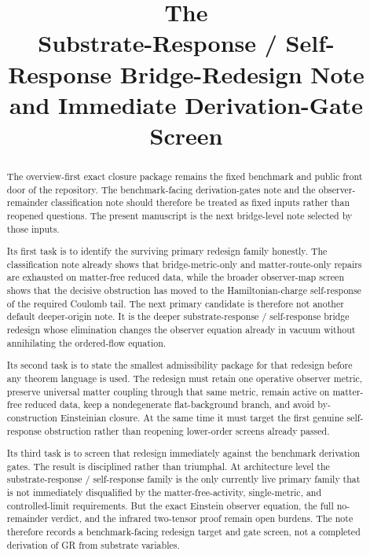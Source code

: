 \documentclass[11pt]{article}
\title{\textbf{The \TheoryName{}}\\[0.4em]
\large Substrate-Response / Self-Response Bridge-Redesign Note\\
\large and Immediate Derivation-Gate Screen}
\author{}
\date{}
\newcommand{\ExactClosure}{exact closure}
\begin{document}
\maketitle

\begin{abstract}
The overview-first \ExactClosure{} package remains the fixed benchmark and public front door of the repository. The benchmark-facing derivation-gates note and the observer-remainder classification note should therefore be treated as fixed inputs rather than reopened questions. The present manuscript is the next bridge-level note selected by those inputs.

Its first task is to identify the surviving primary redesign family honestly. The classification note already shows that bridge-metric-only and matter-route-only repairs are exhausted on matter-free reduced data, while the broader observer-map screen shows that the decisive obstruction has moved to the Hamiltonian-charge self-response of the required Coulomb tail. The next primary candidate is therefore not another default deeper-origin note. It is the deeper substrate-response / self-response bridge redesign whose elimination changes the observer equation already in vacuum without annihilating the ordered-flow equation.

Its second task is to state the smallest admissibility package for that redesign before any theorem language is used. The redesign must retain one operative observer metric, preserve universal matter coupling through that same metric, remain active on matter-free reduced data, keep a nondegenerate flat-background branch, and avoid by-construction Einsteinian closure. At the same time it must target the first genuine self-response obstruction rather than reopening lower-order screens already passed.

Its third task is to screen that redesign immediately against the benchmark derivation gates. The result is disciplined rather than triumphal. At architecture level the substrate-response / self-response family is the only currently live primary family that is not immediately disqualified by the matter-free-activity, single-metric, and controlled-limit requirements. But the exact Einstein observer equation, the full no-remainder verdict, and the infrared two-tensor proof remain open burdens. The note therefore records a benchmark-facing redesign target and gate screen, not a completed derivation of GR from substrate variables.
\end{abstract}
\end{document}
